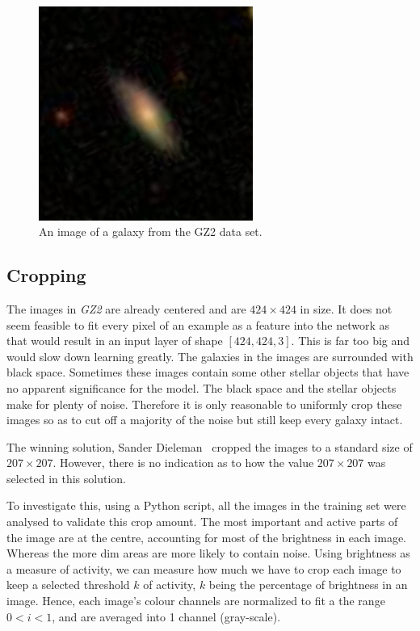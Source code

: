 \documentclass[12pt,a4paper,oneside,oldfontcommands]{memoir}
\begin{document}
    \begin{figure}[ht]
    \center
      \includegraphics[width=7cm]{images/100023.jpg}
      \caption{An image of a galaxy from the GZ2 data set.}
      \label{fig:GZ2-1}
    \end{figure}
      

\subsection{Cropping} \label{Cropping}

The images in \textit{GZ2} are already centered and are \(424\times424\) in size. It does not seem feasible to fit every pixel of an example as a feature into the network as that would result in an input layer of shape \([424, 424, 3]\). This is far too big and would slow down learning greatly. The galaxies in the images are surrounded with black space. Sometimes these images contain some other stellar objects that have no apparent significance for the model. The black space and the stellar objects make for plenty of noise. Therefore it is only reasonable to uniformly crop these images so as to cut off a majority of the noise but still keep every galaxy intact. 

The winning solution, Sander Dieleman~\cite{Sanders-GZ} cropped the images to a standard size of \(207\times207\). However, there is no indication as to how the value \(207\times207\) was selected in this solution. 

To investigate this, using a Python script, all the images in the training set were analysed to validate this crop amount. The most important and active parts of the image are at the centre, accounting for most of the brightness in each image. Whereas the more dim areas are more likely to contain noise. Using brightness as a measure of activity, we can measure how much we have to crop each image to keep a selected threshold \(k\) of activity, \(k\) being the percentage of brightness in an image. Hence, each image’s colour channels are normalized to fit a the range \(0 < i < 1\), and are averaged into 1 channel (gray-scale).
\end{document}
